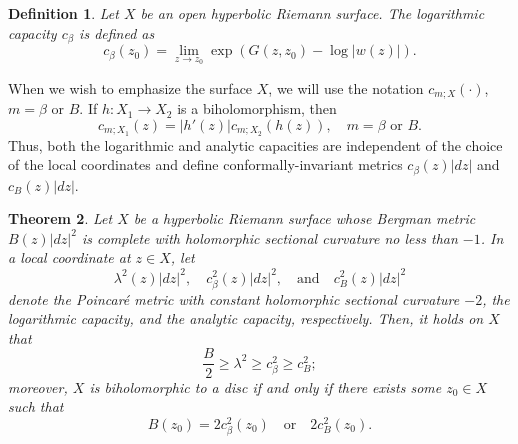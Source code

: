 \documentclass[12pt] {article}
\newtheorem{theorem}{Theorem}[section]
\newtheorem{definition}[theorem]{Definition}
\numberwithin{equation}{section}
\begin{document}
\begin{definition}

Let $X$ be an open hyperbolic Riemann surface.  The logarithmic capacity $c_{\beta}$ is defined as
 $$
c_{\beta}(z_0) = \lim_{z \to z_0} \exp(G(z, z_0) - \log|w(z)|).
 $$


\end{definition}

  When we wish to emphasize the surface $X$,  
we will use the notation $c_{m; X}(\cdot)$, $m = \beta  \text{ or } B$.  If $h:X_1 \to X_2$ is a biholomorphism, then
 $$
c_{m; X_1}(z) = |h'(z)|c_{m; X_2}(h(z)), \quad m = \beta  \text{ or } B.
 $$
Thus, both the logarithmic and analytic capacities are independent of the choice of the local coordinates and define conformally-invariant metrics $c_\beta(z)|dz|$ and $c_B(z)|dz|$.  











\medskip







 \begin{theorem} \label{one dim improved}
Let $X$ be a hyperbolic Riemann surface whose Bergman metric $B(z)|dz|^2$ is complete with  holomorphic sectional curvature   no less than \(-1\). In a local coordinate at $z \in X$, let
$$
\lambda^2(z) |dz|^2, \quad c^2_\beta(z) |dz|^2, \quad \text{and} \quad c^2_B(z) |dz|^2
$$
denote the Poincar\'e metric with constant  holomorphic sectional curvature \(-2\), the logarithmic capacity, and the analytic capacity, respectively. Then, it holds on $X$ that
\begin{equation} \label{chain}
\frac{B}{2} \geq \lambda^2 \geq c^2_{\beta} \geq c^2_B;
\end{equation}
moreover, $X$ is biholomorphic to a disc if and only if there exists some $z_0 \in X$ such that
$$
B(z_0) = 2 c^2_\beta(z_0) \quad \text{or} \quad 2 c^2_B(z_0).
$$
\end{theorem}


  
 
   \medskip
\end{document}
